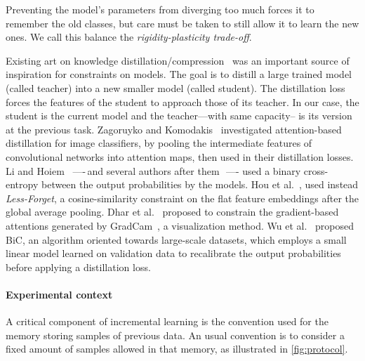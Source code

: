Preventing the model's parameters from diverging too much forces it to remember the old classes, but
care must be taken to still allow it to learn the new ones. We call this balance the
\textit{rigidity-plasticity trade-off}.

Existing art on knowledge distillation/compression~\citep{hinton2015knowledge_distillation} was an
important source of inspiration for constraints on models. The goal is to distill a large trained
model (called teacher) into a new smaller model (called student). The distillation loss forces the
features of the student to approach those of its teacher. In our case, the student is the current
model and the teacher---with same capacity-- is its version at the previous task. Zagoruyko and
Komodakis~\citep{komodakis2017attention_residual_distillation} investigated attention-based
distillation for image classifiers, by pooling the intermediate features of convolutional networks
into attention maps, then used in their distillation losses. Li and Hoiem~\citep{li2018lwf} —-\,and
several authors after
them~\citep{rebuffi2017icarl,castro2018end_to_end_inc_learn,wu2019bias_correction}\,—- used a binary
cross-entropy between the output probabilities by the models. Hou et al.~\citep{hou2019ucir}, used
instead \textit{Less-Forget}, a cosine-similarity constraint on the flat feature embeddings after
the global average pooling. Dhar et al.~\citep{dhar2019learning_without_memorizing_gradcam} proposed
to constrain the gradient-based attentions generated by GradCam~\citep{selvaraju2017gradcam}, a
visualization method. Wu et al.~\citep{wu2019bias_correction} proposed BiC, an algorithm oriented
towards large-scale datasets, which employs a small linear model learned on validation data to
recalibrate the output probabilities before applying a distillation loss.

\paragraph{Experimental context} A critical component of incremental learning is the convention used
for the memory storing samples of previous data. An usual convention is to consider a fixed amount
of samples allowed in that memory, as illustrated in \autoref{fig:protocol}.

